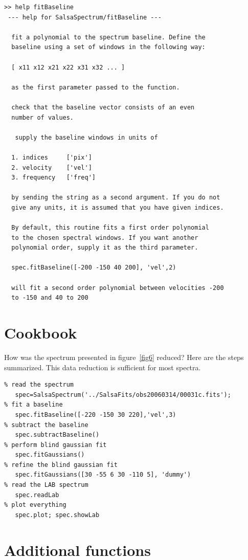 \documentclass[11pt,a4paper]{article}
\begin{document}
\begin{lstlisting}
>> help fitBaseline
 --- help for SalsaSpectrum/fitBaseline ---

  fit a polynomial to the spectrum baseline. Define the
  baseline using a set of windows in the following way:
 
  [ x11 x12 x21 x22 x31 x32 ... ]
 
  as the first parameter passed to the function.
 
  check that the baseline vector consists of an even
  number of values.
 
   supply the baseline windows in units of
 
  1. indices     ['pix']
  2. velocity    ['vel']
  3. frequency   ['freq']
 
  by sending the string as a second argument. If you do not
  give any units, it is assumed that you have given indices.
 
  By default, this routine fits a first order polynomial
  to the chosen spectral windows. If you want another
  polynomial order, supply it as the third parameter.
 
  spec.fitBaseline([-200 -150 40 200], 'vel',2)
  
  will fit a second order polynomial between velocities -200
  to -150 and 40 to 200
\end{lstlisting}

\section{Cookbook}
\label{sec:cookbook}

How was the spectrum presented in figure~\ref{fig6}
reduced? Here are the steps summarized. This data
reduction is sufficient for most spectra.
\begin{lstlisting}
% read the spectrum
   spec=SalsaSpectrum('../SalsaFits/obs20060314/00031c.fits'); 
% fit a baseline
   spec.fitBaseline([-220 -150 30 220],'vel',3) 
% subtract the baseline
   spec.subtractBaseline() 
% perform blind gaussian fit
   spec.fitGaussians()
% refine the blind gaussian fit
   spec.fitGaussians([30 -55 6 30 -110 5], 'dummy') 
% read the LAB spectrum
   spec.readLab
% plot everything
   spec.plot; spec.showLab
\end{lstlisting}


\newpage
\section{Additional functions}
\label{sec:additional-function}
\end{document}
